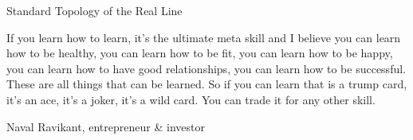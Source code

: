 \begin{section}{Standard Topology of the Real Line}
\epigraph{If you learn how to learn, it's the ultimate meta skill and I believe you can learn how to be healthy, you can learn how to be fit, you can learn how to be happy, you can learn how to have good relationships, you can learn how to be successful. These are all things that can be learned. So if you can learn that is a trump card, it's an ace, it's a joker, it's a wild card. You can trade it for any other skill.}{Naval Ravikant,  entrepreneur \& investor}

\end{section}